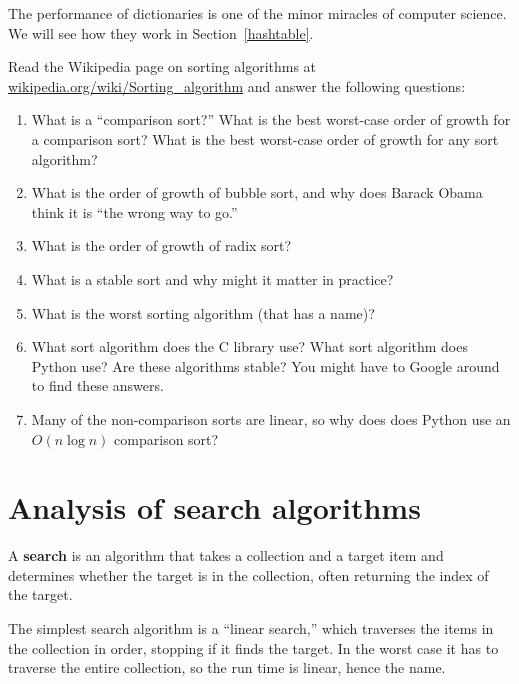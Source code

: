 \documentclass[10pt]{book}
\begin{document}
The performance of dictionaries is one of the minor miracles of
computer science.  We will see how they work in
Section~\ref{hashtable}.



\begin{ex}

Read the Wikipedia page on sorting algorithms at
\url{wikipedia.org/wiki/Sorting_algorithm} and answer
the following questions:

\begin{enumerate}

\item What is a ``comparison sort?'' What is the best worst-case order
  of growth for a comparison sort?  What is the best worst-case order
  of growth for any sort algorithm?

\item What is the order of growth of bubble sort, and why does Barack
  Obama think it is ``the wrong way to go.''

\item What is the order of growth of radix sort?

\item What is a stable sort and why might it matter in practice?

\item What is the worst sorting algorithm (that has a name)?

\item What sort algorithm does the C library use?  What sort algorithm
  does Python use?  Are these algorithms stable?  You might have to
  Google around to find these answers.

\item Many of the non-comparison sorts are linear, so why does does
  Python use an $O(n \log n)$ comparison sort?

\end{enumerate}

\end{ex}


\section{Analysis of search algorithms}

A {\bf search} is an algorithm that takes a collection and a target
item and determines whether the target is in the collection, often
returning the index of the target.

The simplest search algorithm is a ``linear search,'' which traverses
the items in the collection in order, stopping if it finds the target.
In the worst case it has to traverse the entire collection, so the run
time is linear, hence the name.
\end{document}
